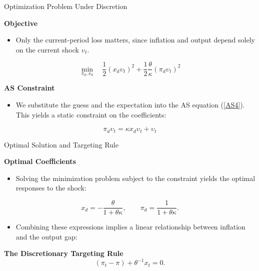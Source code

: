 \documentclass[11pt,aspectratio=169]{beamer}
\begin{document}
\begin{frame}{Optimization Problem Under Discretion}
\small

\textbf{Objective}
\begin{itemize}
    \item Only the current-period loss matters, since inflation and output depend solely on the current shock $\upsilon_t$.
\end{itemize}

\begin{equation*}
\min_{\pi_d, x_d} \quad \frac{1}{2} (x_d \upsilon_t)^2 + \frac{1}{2} \frac{\theta}{\kappa} (\pi_d \upsilon_t)^2
\end{equation*}

\textbf{AS Constraint}
\begin{itemize}
    \item We substitute the guess and the expectation into the AS equation (\ref{AS4}). This yields a static constraint on the coefficients:
\end{itemize}

\begin{equation*}
\pi_d \upsilon_t = \kappa x_d \upsilon_t + \upsilon_t
\end{equation*}

\end{frame}

\begin{frame}{Optimal Solution and Targeting Rule}
\small

\textbf{Optimal Coefficients}
\begin{itemize}
    \item Solving the minimization problem subject to the constraint yields the optimal responses to the shock:
\end{itemize}

\begin{equation*}
x_{d}=-\frac{\theta }{1+\theta \kappa }, \qquad \pi _{d}=\frac{1}{1+\theta \kappa }.
\end{equation*}


\begin{itemize}
    \item Combining these expressions implies a linear relationship between inflation and the output gap:
\end{itemize}
\textbf{The Discretionary Targeting Rule}
\begin{equation}
(\pi _{t}-\pi )+\theta ^{-1}x_t = 0.
\label{IT2}
\end{equation}


\end{frame}
\end{document}
